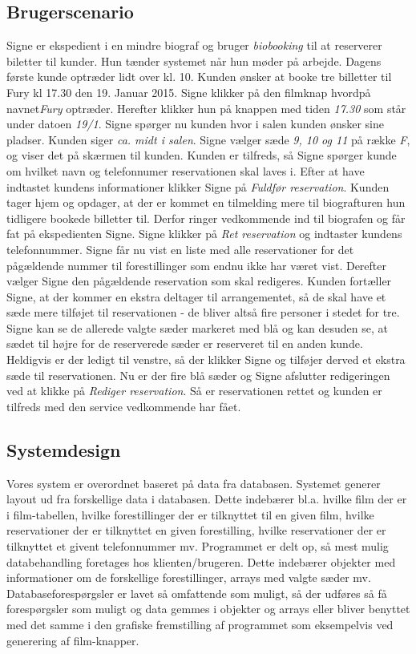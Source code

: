 \documentclass[final]{report}
\begin{document}
\subsection{Brugerscenario}
Signe er ekspedient i en mindre biograf og bruger \emph{biobooking} til at reserverer biletter til kunder. Hun tænder systemet når hun møder på arbejde. Dagens første kunde optræder lidt over kl. 10. Kunden ønsker at booke tre billetter til Fury kl 17.30 den 19. Januar 2015. Signe klikker på den filmknap hvordpå navnet\emph{Fury} optræder. Herefter klikker hun på knappen med tiden \emph{17.30} som står under datoen \emph{19/1}. Signe spørger nu kunden hvor i salen kunden ønsker sine pladser. Kunden siger \emph{ca. midt i salen}. Signe vælger sæde \emph{9, 10 og 11} på række \emph{F}, og viser det på skærmen til kunden. Kunden er tilfreds, så Signe spørger kunde om hvilket navn og telefonnumer reservationen skal laves i. Efter at have indtastet kundens informationer klikker Signe på \emph{Fuldfør reservation}. Kunden tager hjem og opdager, at der er kommet en tilmelding mere til biografturen hun tidligere bookede billetter til. Derfor ringer vedkommende ind til biografen og får fat på ekspedienten Signe. Signe klikker på \emph{Ret reservation} og indtaster kundens telefonnummer. Signe får nu vist en liste med alle reservationer for det pågældende nummer til forestillinger som endnu ikke har været vist. Derefter vælger Signe den pågældende reservation som skal redigeres. Kunden fortæller Signe, at der kommer en ekstra deltager til arrangementet, så de skal have et sæde mere tilføjet til reservationen - de bliver altså fire personer i stedet for tre. Signe kan se de allerede valgte sæder markeret med blå og kan desuden se, at sædet til højre for de reserverede sæder er reserveret til en anden kunde. Heldigvis er der ledigt til venstre, så der klikker Signe og tilføjer derved et ekstra sæde til reservationen. Nu er der fire blå sæder og Signe afslutter redigeringen ved at klikke på \emph{Rediger reservation}. Så er reservationen rettet og kunden er tilfreds med den service vedkommende har fået.

\subsection{Systemdesign}
Vores system er overordnet baseret på data fra databasen. Systemet generer layout ud fra forskellige data i databasen. Dette indebærer bl.a. hvilke film der er i film-tabellen, hvilke forestillinger der er tilknyttet til en given film, hvilke reservationer der er tilknyttet en given forestilling, hvilke reservationer der er tilknyttet et givent telefonnummer mv. Programmet er delt op, så mest mulig databehandling foretages hos klienten/brugeren. Dette indebærer objekter med informationer om de forskellige forestillinger, arrays med valgte sæder mv. Databaseforespørgsler er lavet så omfattende som muligt, så der udføres så få forespørgsler som muligt og data gemmes i objekter og arrays eller bliver benyttet med det samme i den grafiske fremstilling af programmet som eksempelvis ved generering af film-knapper. 
\end{document}
